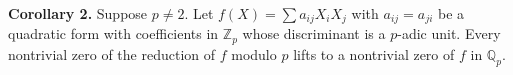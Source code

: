\textbf{Corollary 2.} Suppose $p \neq 2$. Let $f(X) = \sum a_{ij} X_i X_j$ with $a_{ij} = a_{ji}$ be a quadratic form with coefficients in $\mathbb{Z}_p$ whose discriminant is a $p$-adic unit. Every nontrivial zero of the reduction of $f$ modulo $p$ lifts to a nontrivial zero of $f$ in $\mathbb{Q}_p$.
